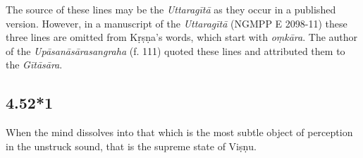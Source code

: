 \begin{ekdosis}
\begin{philcomm}[hp04_052]
The source of these lines may be the \emph{Uttaragītā} as they occur in a published version. However, in a manuscript of the \emph{Uttaragītā} (NGMPP E 2098-11) these three lines are omitted from Kṛṣṇa's words, which start with \emph{oṃkāra}. The author of the \emph{Upāsanāsārasangraha} (f. 111) quoted these lines and attributed them to the \emph{Gītāsāra}. 


\end{philcomm}


\subsection*{4.52*1}
\begin{translation}[hp04_052]
When the mind dissolves into that which is the most subtle object of perception in the unstruck sound, that is the supreme state of Viṣṇu.
\end{translation}


\end{ekdosis}
